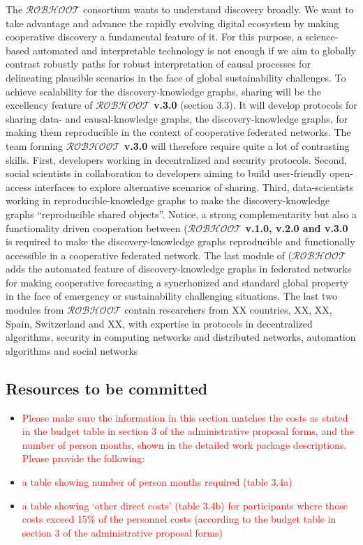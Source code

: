 \documentclass[11pt, a4paper]{article} %
\begin{document}
  The {\bf $\mathcal{ROBHOOT}$} consortium wants to understand
  discovery broadly. We want to take advantage and advance the rapidly
  evolving digital ecosystem by making cooperative discovery a
  fundamental feature of it. For this purpose, a science-based
  automated and interpretable technology is not enough if we aim to
  globally contrast robustly paths for robust interpretation of causal
  processes for delineating plausible scenarios in the face of global
  sustainability challenges. To achieve scalability for the
  discovery-knowledge graphs, sharing will be the excellency feature
  of {\bf $\mathcal{ROBHOOT}$ v.3.0} (section 3.3). It will develop
  protocols for sharing data- and causal-knowledge graphs, the
  discovery-knowledge graphs, for making them reproducible in the
  context of cooperative federated networks. The team forming {\bf
    $\mathcal{ROBHOOT}$ v.3.0} will therefore require quite a lot of
  contrasting skills. First, developers working in decentralized and
  security protocols. Second, social scientists in collaboration to
  developers aiming to build user-friendly open-access interfaces to
  explore alternative scenarios of sharing. Third, data-scientists
  working in reproducible-knowledge graphs to make the
  discovery-knowledge graphs ``reproducible shared objects''. Notice,
  a strong complementarity but also a functionality driven cooperation
  between ({\bf $\mathcal{ROBHOOT}$ v.1.0, v.2.0 and v.3.0} is
  required to make the discovery-knowledge graphs reproducible and
  functionally accessible in a cooperative federated network. The last
  module of ({\bf $\mathcal{ROBHOOT}$} adds the automated feature of
  discovery-knowledge graphs in federated networks for making
  cooperative forecasting a syncrhonized and standard global property
  in the face of emergency or sustainability challenging
  situations. The last two modules from {\bf $\mathcal{ROBHOOT}$}
  contain researchers from XX countries, XX, XX, Spain, Switzerland
  and XX, with expertise in protocols in decentralized algorithms,
  security in computing networks and distributed networks, automation
  algorithms and social networks
  
  \subsection{Resources to be committed}
 
  \begin{itemize}
  \item \textcolor{red}{Please make sure the information in this
      section matches the costs as stated in the budget table in
      section 3 of the administrative proposal forms, and the number
      of person months, shown in the detailed work package
      descriptions.  Please provide the following:}
 \item \textcolor{red}{a table showing number of person months required
    (table 3.4a)}
  \item \textcolor{red}{a table showing ‘other direct costs’ (table
      3.4b) for participants where those costs exceed 15\% of the
      personnel costs (according to the budget table in section 3 of
      the administrative proposal forms)}
\end{itemize}
\end{document}
